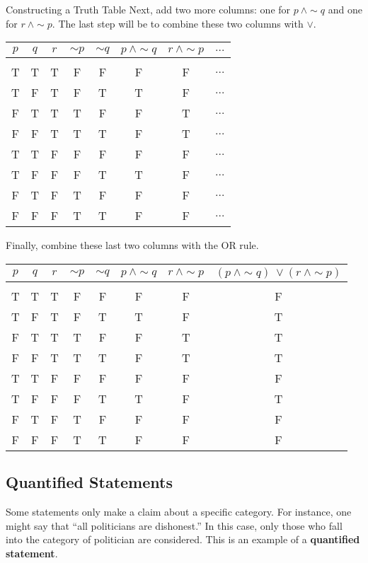 \begin{example}[https://www.youtube.com/watch?v=Sdh658OUmFk]{Constructing a Truth Table}
Next, add two more columns: one for $p\ \wedge \sim q$ and one for $r\ \wedge \sim p$.  The last step will be to combine these two columns with $\vee$.
\begin{center}
\begin{tabular}{|c c c c c c c c|}
\hline
$p$ & $q$ & $r$ & $\sim p$ & $\sim q$ & $p\ \wedge \sim q$ & $r\ \wedge \sim p$ & $\ldots$\\
\hline
& & & & & & &\\
T & T & T & F & F & F & F & $\ldots$\\
T & F & T & F & T & T & F & $\ldots$\\
F & T & T & T & F & F & T & $\ldots$\\
F & F & T & T & T & F & T & $\ldots$\\
T & T & F & F & F & F & F & $\ldots$\\
T & F & F & F & T & T & F & $\ldots$\\
F & T & F & T & F & F & F & $\ldots$\\
F & F & F & T & T & F & F & $\ldots$\\
\hline
\end{tabular}
\end{center}

Finally, combine these last two columns with the OR rule.
\begin{center}
{\color{green!30!black}
\begin{tabular}{|c c c c c c c c|}
\hline
$p$ & $q$ & $r$ & $\sim p$ & $\sim q$ & $p\ \wedge \sim q$ & $r\ \wedge \sim p$ & $(p\ \wedge \sim q)\ \vee (r\ \wedge \sim p)$\\
\hline
& & & & & & &\\
T & T & T & F & F & F & F & F\\
T & F & T & F & T & T & F & T\\
F & T & T & T & F & F & T & T\\
F & F & T & T & T & F & T & T\\
T & T & F & F & F & F & F & F\\
T & F & F & F & T & T & F & T\\
F & T & F & T & F & F & F & F\\
F & F & F & T & T & F & F & F\\
\hline
\end{tabular}}
\end{center}
\end{example}
\vfill
\pagebreak

\subsection{Quantified Statements}
Some statements only make a claim about a specific category.  For instance, one might say that ``all politicians are dishonest.''  In this case, only those who fall into the category of politician are considered.  This is an example of a \textbf{quantified statement}. 

